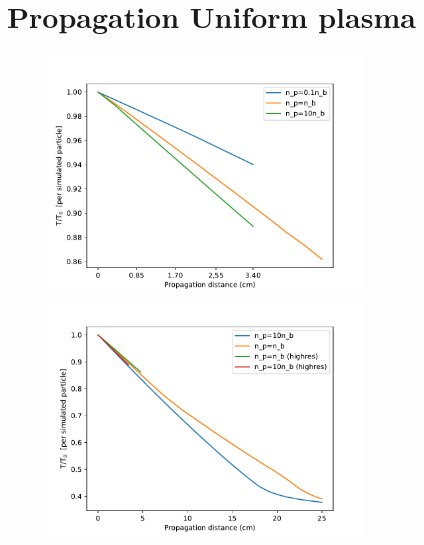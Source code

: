 \documentclass[%
onecolumn, notitlepage,
 amsmath,amssymb,
 aps,
]{article}
\begin{document}
\newpage 



\newpage
\section*{Propagation Uniform plasma}
\begin{figure}[!ht]
\centering
\includegraphics[width=0.75\textwidth]{Energy30pc_per_particle_past_sat_length.pdf}
\includegraphics[width=0.75\textwidth]{Energy30pc_per_particle_lowres.pdf}
\end{figure}
\end{document}
